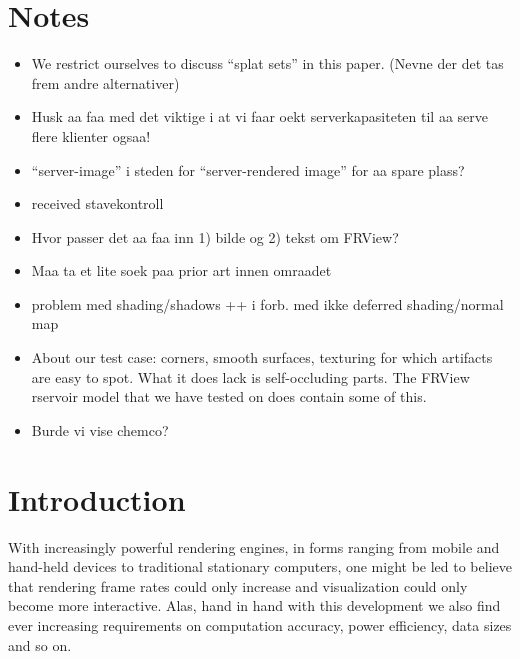 \section{Notes}

\begin{itemize}

\item We restrict ourselves to discuss ``splat sets'' in this paper. (Nevne der det
tas frem andre alternativer)

\item
Husk aa faa med det viktige i at vi faar oekt serverkapasiteten til aa
serve flere klienter ogsaa!

\item
``server-image'' i steden for ``server-rendered image'' for aa spare plass?

\item received stavekontroll

\item Hvor passer det aa faa inn 1) bilde og 2) tekst om FRView?

\item Maa ta et lite soek paa prior art innen omraadet

\item problem med shading/shadows ++ i forb. med ikke deferred shading/normal map

\item About our test case: corners, smooth surfaces, texturing for which artifacts are easy to
spot. What it does lack is self-occluding parts. The FRView rservoir model that
we have tested on does contain some of this.

\item Burde vi vise chemco?

\end{itemize}

\section{Introduction}

With increasingly powerful rendering engines, in forms ranging from mobile and
hand-held devices to traditional stationary computers, one might be led to
believe that rendering frame rates could only increase and visualization could
only become more interactive. Alas, hand in hand with this development we also
find ever increasing requirements on computation accuracy, power efficiency,
data sizes and so on.

